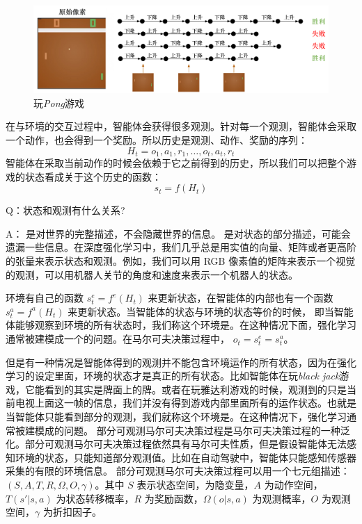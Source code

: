 \begin{figure}[htb]
    \centering
    \includegraphics[width=0.7\linewidth]{res/ch1/1.21}
    \caption{玩\textit{Pong}游戏}
    \label{fig:pong_game_pic}
\end{figure}

在与环境的交互过程中，智能体会获得很多观测。针对每一个观测，智能体会采取一个动作，也会得到一个奖励。所以历史是观测、动作、奖励的序列：
\begin{equation}
    H_{t}=o_{1}, a_{1}, r_{1}, \ldots, o_{t}, a_{t}, r_{t}
    \label{eq:his}
\end{equation}
智能体在采取当前动作的时候会依赖于它之前得到的历史，所以我们可以把整个游戏的状态看成关于这个历史的函数：
\begin{equation}
    s_{t}=f\left(H_{t}\right)
    \label{eq:observation}
\end{equation}


Q：状态和观测有什么关系?

A： 是对世界的完整描述，不会隐藏世界的信息。 是对状态的部分描述，可能会遗漏一些信息。在深度强化学习中，我们几乎总是用实值的向量、矩阵或者更高阶的张量来表示状态和观测。例如，我们可以用 RGB 像素值的矩阵来表示一个视觉的观测，可以用机器人关节的角度和速度来表示一个机器人的状态。

环境有自己的函数 $s_{t}^{e}=f^{e}\left(H_{t}\right)$ 来更新状态，在智能体的内部也有一个函数 $s_{t}^{a}=f^{a}\left(H_{t}\right)$ 来更新状态。当智能体的状态与环境的状态等价的时候，
即当智能体能够观察到环境的所有状态时，我们称这个环境是。在这种情况下面，强化学习通常被建模成一个的问题。在马尔可夫决策过程中， $o_{t}=s_{t}^{e}=s_{t}^{a}$。

但是有一种情况是智能体得到的观测并不能包含环境运作的所有状态，因为在强化学习的设定里面，环境的状态才是真正的所有状态。比如智能体在玩\textit{black jack}游戏，它能看到的其实是牌面上的牌。或者在玩雅达利游戏的时候，观测到的只是当前电视上面这一帧的信息，我们并没有得到游戏内部里面所有的运作状态。也就是当智能体只能看到部分的观测，我们就称这个环境是。在这种情况下，强化学习通常被建模成的问题。
部分可观测马尔可夫决策过程是马尔可夫决策过程的一种泛化。部分可观测马尔可夫决策过程依然具有马尔可夫性质，但是假设智能体无法感知环境的状态，只能知道部分观测值。比如在自动驾驶中，智能体只能感知传感器采集的有限的环境信息。
部分可观测马尔可夫决策过程可以用一个七元组描述：$(S,A,T,R,\varOmega,O,\gamma)$。其中 $S$ 表示状态空间，为隐变量，$A$ 为动作空间，$T(s'|s,a)$ 为状态转移概率，$R$ 为奖励函数，$\varOmega(o|s,a)$ 为观测概率，$O$ 为观测空间，$\gamma$ 为折扣因子。


